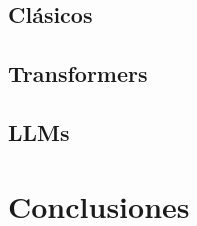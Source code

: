 \documentclass[11pt,spanish,listoffigures,listoftables]{tfgetsinf}
\begin{document}
\section{Clásicos}

\section{Transformers}


\section{LLMs}

\chapter{Conclusiones}

\cleardoublepage
\printbibliography





\end{document}
